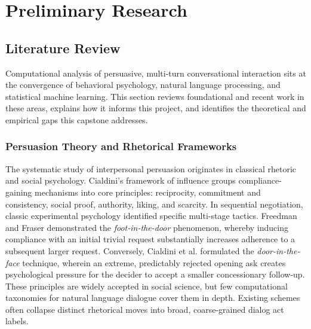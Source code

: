 \chapter{Preliminary Research}
\label{ch:research}

\section{Literature Review}
\label{sec:literature}

Computational analysis of persuasive, multi-turn conversational interaction sits at the convergence of behavioral psychology, natural language processing, and statistical machine learning. This section reviews foundational and recent work in these areas, explains how it informs this project, and identifies the theoretical and empirical gaps this capstone addresses.

\subsection{Persuasion Theory and Rhetorical Frameworks}
The systematic study of interpersonal persuasion originates in classical rhetoric and social psychology. Cialdini's framework of influence \cite{cialdini2001influence} groups compliance-gaining mechanisms into core principles: reciprocity, commitment and consistency, social proof, authority, liking, and scarcity. In sequential negotiation, classic experimental psychology identified specific multi-stage tactics. Freedman and Fraser \cite{freedman1966compliance} demonstrated the \textit{foot-in-the-door} phenomenon, whereby inducing compliance with an initial trivial request substantially increases adherence to a subsequent larger request. Conversely, Cialdini et al. \cite{cialdini1975reciprocal} formulated the \textit{door-in-the-face} technique, wherein an extreme, predictably rejected opening ask creates psychological pressure for the decider to accept a smaller concessionary follow-up. These principles are widely accepted in social science, but few computational taxonomies for natural language dialogue cover them in depth. Existing schemes often collapse distinct rhetorical moves into broad, coarse-grained dialog act labels.

